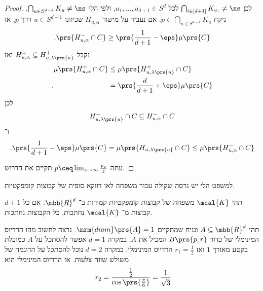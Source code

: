 \documentclass[a4paper,10pt,twoside,openany]{book}
\begin{document}
\begin{proof}
לכן
$\bigcap_{i \in [d+1]} K_{u_i} \neq \ns$
לכל
$u_1, \ldots, u_{d+1} \in S^d$,
ולפי הלי
$\bigcap_{u \in S^{d-1}} K_u \neq \ns$.
ניקח
$p \in \bigcap_{u \in S^{d-1}} K_u$.
אם נעביר על מישור
$H_{u,\alpha}$
שכיוונו
$u \in S^{d-1}$
דרך
$p$,
אז
\begin{align*}
\text{.} \prs{H_{u,\alpha}^- \cap C} \geq \prs{\frac{1}{d+1} - \eps} \mu\prs{C}
\end{align*}
נקבל
$H_{u,\alpha}^+ \subseteq H_{u,\lambda\prs{u}}^+$
ואז
\begin{align*}
\mu\prs{H_{u,\alpha}^+ \cap C} &\leq \mu\prs{H_{u,\lambda\prs{u}}^+ \cap C}
\\ \text{.} \hphantom{\mu\prs{H_{u,\alpha}^+ \cap C}} &= \prs{\frac{d}{d+1} + \eps} \mu\prs{C}
\end{align*}
לכן
\[H_{u,\lambda\prs{u}}^- \cap C \subseteq H_{u,\alpha}^- \cap C\]
ו־%
\begin{align*}
\text{.} \prs{\frac{1}{d+1} - \eps} \mu\prs{C} = \mu\prs{H_{u,\lambda\prs{u}} \cap C} \leq \mu\prs{H_{u,\alpha}^- \cap C}
\end{align*}

עתה
$p \ceq \lim_{z\to\infty} \frac{p_z}{z}$
תקיים את הדרוש.
\end{proof}


למשפט הלי יש גרסה שקולה עבור משפחה לאו דווקא סופית של קבוצות קומפקטיות.

\begin{theorem}[הלי]
תהי
$\mcal{K}$
משפחה של קבוצות קומפקטיות קמורות ב־%
$\mbb{R}^d$.
אם כל
$d+1$
קבוצות מ־%
$\mcal{K}$
נחתכות, כל הקבוצות נחתכות.
\end{theorem}

תהי
$A \subseteq \mbb{R}^d$
ונניח שמתקיים
$\mrm{diam}\prs{A} = 1$.
נרצה לחשוב מהו הרדיוס המינימלי של כדור
$B\prs{p,r}$
המכיל את
$A$.
במקרה
$d = 1$
אפשר להסתכל על
$A$
כמוכלת בקטע מאורך
$1$
ואז
$r_1 = \frac{1}{2}$
הרדיוס המינימלי.
במקרה
$d=2$
נוכל להסתכל על הדוגמה של משולש שווה צלעות.
אז הרדיוס המינימלי הוא
\[\text{.} r_2 = \frac{\frac{1}{2}}{\cos\prs{\frac{\pi}{6}}} = \frac{1}{\sqrt{3}}\]
\end{document}
